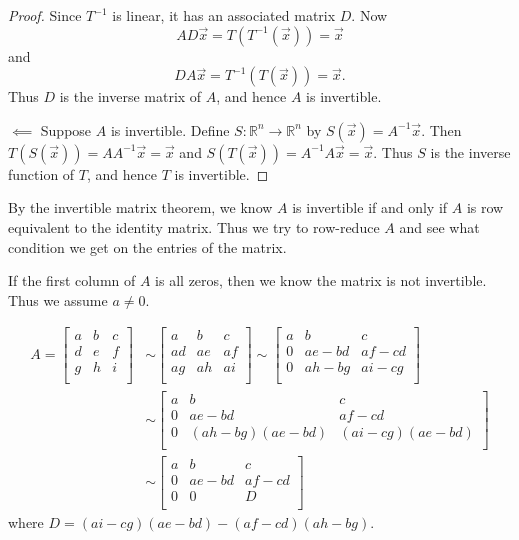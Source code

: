 \documentclass[12pt,letterpaper]{article}
\begin{document}
\begin{enumerate}
\begin{proof}
  Since $T^{-1}$ is linear, it has an associated matrix $D$. Now $$AD\vec{x} =T(T^{-1}(\vec{x}))=\vec{x}$$ and $$DA\vec{x} =T^{-1}(T(\vec{x})) =\vec{x}.$$ Thus $D$ is the inverse matrix of $A$, and hence $A$ is invertible. 
  
  $\impliedby$ Suppose $A$ is invertible. Define $S: \mathbb{R}^n \to \mathbb{R}^n$ by $S(\vec{x})=A^{-1}\vec{x}$. Then $T(S(\vec{x}))=AA^{-1}\vec{x} = \vec{x}$ and $S(T(\vec{x})) =A^{-1}A\vec{x}=\vec{x}$. Thus $S$ is the inverse function of $T$, and hence $T$ is invertible. 
  \end{proof}


  \Answer By the invertible matrix theorem, we know $A$ is invertible if and only if $A$ is row equivalent to the identity matrix. Thus we try to row-reduce $A$ and see what condition we get on the entries of the matrix.
  
  If the first column of $A$ is all zeros, then we know the matrix is not invertible. Thus we assume $a \neq 0$.
  
  \begin{align*}
  A=\begin{bmatrix}
  a & b & c\\
  d & e & f\\
  g & h & i\\
  \end{bmatrix}&\sim
\begin{bmatrix}
	a & b & c\\
	ad & ae & af\\
	ag & ah & ai\\
\end{bmatrix}\sim
\begin{bmatrix}
	a & b & c\\
	0 & ae-bd & af-cd\\
	0 & ah-bg & ai-cg\\
\end{bmatrix}\\
&\sim
\begin{bmatrix}
	a & b & c\\
	0 & ae-bd & af-cd\\
	0 & (ah-bg)(ae-bd) & (ai-cg)(ae-bd)\\
\end{bmatrix}\\
&\sim\begin{bmatrix}
	a & b & c\\
	0 & ae-bd & af-cd\\
	0 & 0 & D\\
\end{bmatrix} 
  \end{align*}
where $D=(ai-cg)(ae-bd)-(af-cd)(ah-bg)$.


\end{enumerate}
\end{document}
